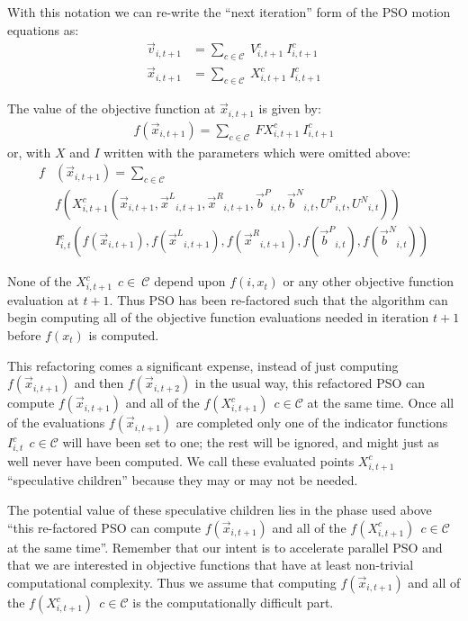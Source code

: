 \documentclass[journal,letterpaper]{IEEEtran}
\providecommand{\pers}{\ensuremath{P}}
\providecommand{\neigh}{\ensuremath{N}}
\providecommand{\leftind}{\ensuremath{L}}
\providecommand{\rightind}{\ensuremath{R}}
\providecommand{\nURand}{\ensuremath{U^\neigh}}
\providecommand{\pURand}{\ensuremath{U^\pers}}
\providecommand{\ppos}{\ensuremath{\Vec{x}}}
\providecommand{\pvel}{\ensuremath{\Vec{v}}}
\providecommand{\nbest}{\ensuremath{\Vec{b}^\neigh}}
\providecommand{\pbest}{\ensuremath{\Vec{b}^\pers}}
\providecommand{\ofunc}{\ensuremath{f}}
\providecommand{\indic}{\ensuremath{I}}
\providecommand{\specvel}{\ensuremath{V}}
\providecommand{\specpos}{\ensuremath{X}}
\providecommand{\specval}{\ensuremath{FX}}
\providecommand{\leftn}{\ensuremath{\Vec{x}^\leftind}}
\providecommand{\rightn}{\ensuremath{\Vec{x}^\rightind}}
\providecommand{\caseset}{\ensuremath{\mathcal{C}}}
\begin{document}
With this notation we can re-write the ``next iteration'' form of the PSO motion equations as:
\begin{align}
\label{eq:vel2update}
	\pvel_{i,t+1} &= \sum_{c \in \caseset} \ \specvel_{i,t+1}^{c} \ \indic_{i,t+1}^{c} \\
\label{eq:pos2update}
	\ppos_{i,t+1} &= \sum_{c \in \caseset} \ \specpos_{i,t+1}^{c} \ \indic_{i,t+1}^{c}
\end{align}

The value of the objective function at $\ppos_{i,t+1}$ is given by:
\begin{align}
\label{eq:val2update}
	\ofunc (\ppos_{i,t+1}) = \sum_{c \in \caseset} \ \specval_{i,t+1}^{c} \ \indic_{i,t+1}^{c}
\end{align}
or, with $\specpos$ and $\indic$ written with the parameters which were omitted above:
\begin{align}
\nonumber
\ofunc & (\ppos_{i,t+1}) = \sum_{c \in \caseset} \\
\nonumber
& \ofunc(\specpos_{i,t+1}^{c}(\ppos_{i,t+1},\leftn_{i,t+1},\rightn_{i,t+1},
\pbest_{i,t},\nbest_{i,t},\pURand_{i,t}, \nURand_{i,t})) \\
\label{eq:val2updatelong}
& \indic_{i,t}^{c}(\ofunc ( \ppos_{i,t+1} ) ,\ofunc(\leftn_{i,t+1}),\ofunc(\rightn_{i,t+1}) ,\ofunc(\pbest_{i,t}) ,\ofunc(\nbest_{i,t}))
\end{align}

None of the $\specpos_{i,t+1}^{c} \ \ c \in\ \caseset$ depend upon $f(i,x_t)$
or any other objective function evaluation at $t+1$.
Thus PSO has been re-factored such that the algorithm can begin computing
all of the objective function evaluations needed in iteration $t+1$ before $f(x_t)$ is computed.

This refactoring comes a significant expense, instead of just computing
$\ofunc(\ppos_{i,t+1})$ and then $\ofunc(\ppos_{i,t+2})$ in the usual way, this refactored PSO
can compute $\ofunc(\ppos_{i,t+1})$ and all 
of the $\ofunc(\specpos_{i,t+1}^{c}) \ \ c \in \caseset$ at the same time.
Once all of the evaluations $f(\ppos_{i,t+1})$ are completed only one
of the indicator functions $\indic_{i,t}^{c} \ \ c \in \caseset$ will have been set to one;
the rest will be ignored, and might just as well never have been computed.
We call these evaluated points $\specpos_{i,t+1}^{c}$ ``speculative children''
because they may or may not be needed.

The potential value of these speculative children lies in the phase used above
``this re-factored PSO
can compute $\ofunc(\ppos_{i,t+1})$ and all 
of the $\ofunc(\specpos_{i,t+1}^{c}) \ \ c \in \caseset$ at the same time''. 
Remember that our intent is to accelerate parallel PSO and that we
are interested in objective functions that have at least non-trivial computational
complexity.
Thus we assume that computing
$\ofunc(\ppos_{i,t+1})$ and all 
of the $\ofunc(\specpos_{i,t+1}^{c}) \ \ c \in \caseset$ is the computationally difficult part.
\end{document}
